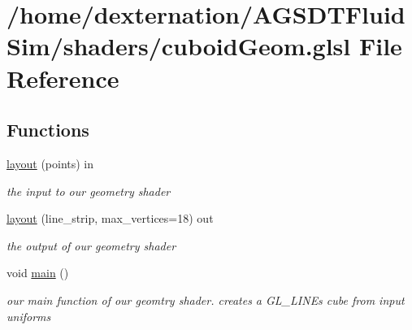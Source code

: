 \hypertarget{cuboid_geom_8glsl}{\section{/home/dexternation/\-A\-G\-S\-D\-T\-Fluid\-Sim/shaders/cuboid\-Geom.glsl File Reference}
\label{cuboid_geom_8glsl}
}
\subsection*{Functions}
\begin{DoxyCompactItemize}
\item 
\hypertarget{cuboid_geom_8glsl_ababb901a0b8e6f569760cb90d5292d76}{\hyperlink{cuboid_geom_8glsl_ababb901a0b8e6f569760cb90d5292d76}{layout} (points) in}\label{cuboid_geom_8glsl_ababb901a0b8e6f569760cb90d5292d76}

\begin{DoxyCompactList}\small\item\em the input to our geometry shader \end{DoxyCompactList}\item 
\hypertarget{cuboid_geom_8glsl_ac1bd88519adba220230ec968a9589e71}{\hyperlink{cuboid_geom_8glsl_ac1bd88519adba220230ec968a9589e71}{layout} (line\-\_\-strip, max\-\_\-vertices=18) out}\label{cuboid_geom_8glsl_ac1bd88519adba220230ec968a9589e71}

\begin{DoxyCompactList}\small\item\em the output of our geometry shader \end{DoxyCompactList}\item 
\hypertarget{cuboid_geom_8glsl_acdef7a1fd863a6d3770c1268cb06add3}{void \hyperlink{cuboid_geom_8glsl_acdef7a1fd863a6d3770c1268cb06add3}{main} ()}\label{cuboid_geom_8glsl_acdef7a1fd863a6d3770c1268cb06add3}

\begin{DoxyCompactList}\small\item\em our main function of our geomtry shader. creates a G\-L\-\_\-\-L\-I\-N\-Es cube from input uniforms \end{DoxyCompactList}\end{DoxyCompactItemize}
